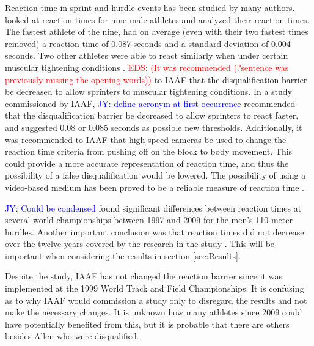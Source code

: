 \documentclass[12pt, letterpaper, titlepage]{article}
\newcommand{\jy}[1]{\textcolor{blue}{JY: #1}}
\newcommand{\eds}[1]{\textcolor{red}{EDS: (#1)}}
\begin{document}
Reaction time in sprint and hurdle events has been studied by many authors.
\citet{pain2007sprint} looked at
reaction times for nine male athletes and analyzed their reaction times.  The
fastest athlete of the nine, had on average (even with their two fastest times 
removed) a reaction time of 0.087 seconds and a standard deviation of 0.004
seconds.  Two other athletes were able to react similarly when under certain
muscular tightening conditions \citep{pain2007sprint}. 
\eds{It was recommended (?sentence was previously missing the opening words)}
to IAAF that the disqualification barrier be decreased to allow sprinters to
muscular tightening conditions.  In a study commissioned by IAAF,
\jy{define acronym at first occurrence}
\citep{komi2009iaaf} recommended that the disqualification 
barrier be decreased to allow sprinters to
react faster, and suggested 0.08 or 0.085 seconds as possible new thresholds.
Additionally, it was recommended to IAAF that high speed cameras be used to
change the reaction time criteria from pushing off on the block to body
movement. This could provide a more accurate representation of 
reaction time, and thus the possibility of a false disqualification would be lowered.
The possibility of using a video-based medium has been proved to be a reliable
measure of reaction time \citep{mudric2015evaluation}.


\jy{Could be condensed}
\citet{pilianidis2012start} found
significant differences between reaction times at several world championships
between 1997 and 2009 for the men's 110 meter hurdles.  Another important
conclusion was that reaction times did not decrease over the twelve years
covered by the research in the study \citep{pilianidis2012start}.  This will
be important when considering the results in section \ref{sec:Results}.


Despite the study, IAAF has not changed the reaction barrier since it was
implemented at the 1999 World Track and Field Championships.  It is confusing
as to why IAAF would commission a study only to disregard the results and not
make the necessary changes.  It is unknown how many athletes since 2009 could
have potentially benefited from this, but it is probable that there are others
besides Allen who were disqualified.
\end{document}
